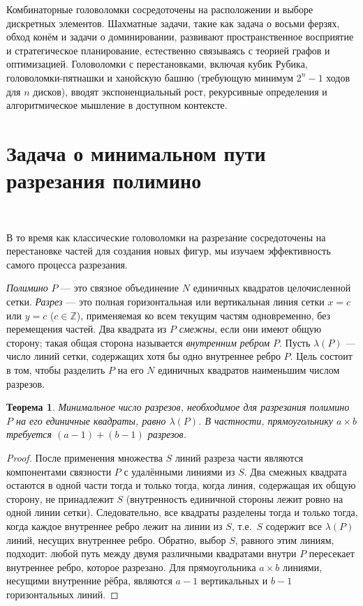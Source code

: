 \documentclass[a4paper,14pt]{extreport}
\theoremstyle{plain}
\newtheorem{theorem}{Теорема}[section]
\theoremstyle{definition}
\theoremstyle{remark}
\begin{document}
Комбинаторные головоломки сосредоточены на расположении и выборе дискретных элементов. Шахматные задачи, такие как задача о восьми ферзях, обход конём и задачи о доминировании, развивают пространственное восприятие и стратегическое планирование, естественно связываясь с теорией графов и оптимизацией. Головоломки с перестановками, включая кубик Рубика, 
головоломки-пятнашки и ханойскую башню (требующую минимум $2^n - 1$ ходов для $n$ дисков), вводят экспоненциальный рост, рекурсивные определения и алгоритмическое мышление в 
доступном контексте.
\section{Задача о минимальном пути разрезания полимино}~\label{sec4.2}

В то время как классические головоломки на разрезание сосредоточены на перестановке частей для создания новых фигур, мы изучаем эффективность самого процесса разрезания.

\emph{Полимино} $P$ --- это связное объединение $N$ единичных квадратов целочисленной сетки. \emph{Разрез} --- это полная горизонтальная или вертикальная линия сетки
$x=c$ или $y=c$ ($c\in\mathbb Z$), применяемая ко всем текущим частям одновременно, без перемещения частей. Два квадрата из $P$ \emph{смежны}, если они имеют общую сторону;
такая общая сторона называется \emph{внутренним ребром} $P$. Пусть $\lambda(P)$ --- число линий сетки, содержащих хотя бы одно внутреннее ребро $P$.
Цель состоит в том, чтобы разделить $P$ на его $N$ единичных квадратов наименьшим числом разрезов.

\begin{theorem}\label{thm:min-dissection-path}
	Минимальное число разрезов, необходимое для разрезания полимино $P$ на его единичные квадраты, равно $\lambda(P)$. В частности, прямоугольнику $a\times b$ требуется $(a-1)+(b-1)$ разрезов.
\end{theorem}

\begin{proof}
	После применения множества $S$ линий разреза части являются компонентами связности $P$ с удалёнными линиями из $S$. Два смежных квадрата остаются в одной части
	тогда и только тогда, когда линия, содержащая их общую сторону, не принадлежит $S$ (внутренность единичной стороны лежит ровно на одной линии сетки).
	Следовательно, все квадраты разделены тогда и только тогда, когда каждое внутреннее ребро лежит на линии из $S$, т.е.\ $S$ содержит все $\lambda(P)$ линий, несущих внутреннее ребро.
	Обратно, выбор $S$, равного этим линиям, подходит: любой путь между двумя различными квадратами внутри $P$ пересекает внутреннее ребро, которое разрезано.
	Для прямоугольника $a\times b$ линиями, несущими внутренние рёбра, являются $a-1$ вертикальных и $b-1$ горизонтальных линий.
\end{proof}
\end{document}
